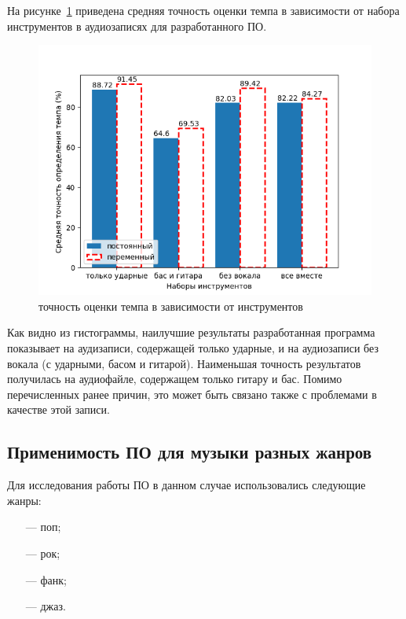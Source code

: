 \newpage

На рисунке~\ref{img:tempo_instr} приведена средняя точность оценки темпа в зависимости от набора инструментов в аудиозаписях для разработанного ПО.

\begin{figure}[h]
	\centering
	\includegraphics[scale=1]{../graphs/tempo_instr.png}
	\caption{точность оценки темпа в зависимости от инструментов}
	\label{img:tempo_instr}
\end{figure}


Как видно из гистограммы, наилучшие результаты разработанная программа показывает на аудизаписи, содержащей только ударные, и на аудиозаписи без вокала (с ударными, басом и гитарой). Наименьшая точность результатов получилась на аудиофайле, содержащем только гитару и бас. Помимо перечисленных ранее причин, это может быть связано также с проблемами в качестве этой записи.

\newpage

\subsection{Применимость ПО для музыки разных жанров}

Для исследования работы ПО в данном случае использовались следующие жанры:

\begin{itemize}
	\item[---] поп;
	\item[---] рок;
	\item[---] фанк;
	\item[---] джаз.
\end{itemize}


